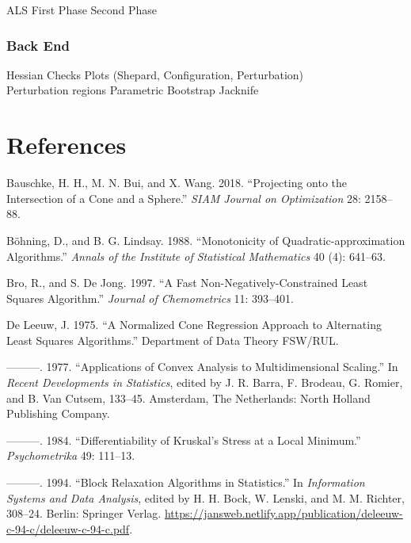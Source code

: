 \documentclass[
  12pt,
]{article}
\newlength{\cslhangindent}
\newenvironment{CSLReferences}[2] %
 {\begin{list}{}{%
  \setlength{\itemindent}{0pt}
  \setlength{\leftmargin}{0pt}
  \setlength{\parsep}{0pt}
  \ifodd #1
   \setlength{\leftmargin}{\cslhangindent}
   \setlength{\itemindent}{-1\cslhangindent}
  \fi
  \setlength{\itemsep}{#2\baselineskip}}}
 {\end{list}}
\begin{document}
ALS
First Phase
Second Phase

\subsubsection{Back End}\label{back-end}

Hessian
Checks
Plots (Shepard, Configuration, Perturbation)\\
Perturbation regions
Parametric Bootstrap
Jacknife

\section*{References}\label{references}

\label{refs}
\begin{CSLReferences}{1}{0}
Bauschke, H. H., M. N. Bui, and X. Wang. 2018. {``{Projecting onto the Intersection of a Cone and a Sphere}.''} \emph{SIAM Journal on Optimization} 28: 2158--88.

Böhning, D., and B. G. Lindsay. 1988. {``{Monotonicity of Quadratic-approximation Algorithms}.''} \emph{Annals of the Institute of Statistical Mathematics} 40 (4): 641--63.

Bro, R., and S. De Jong. 1997. {``A Fast Non-Negatively-Constrained Least Squares Algorithm.''} \emph{Journal of Chemometrics} 11: 393--401.

De Leeuw, J. 1975. {``{A Normalized Cone Regression Approach to Alternating Least Squares Algorithms}.''} Department of Data Theory FSW/RUL.

---------. 1977. {``Applications of Convex Analysis to Multidimensional Scaling.''} In \emph{Recent Developments in Statistics}, edited by J. R. Barra, F. Brodeau, G. Romier, and B. Van Cutsem, 133--45. Amsterdam, The Netherlands: North Holland Publishing Company.

---------. 1984. {``{Differentiability of Kruskal's Stress at a Local Minimum}.''} \emph{Psychometrika} 49: 111--13.

---------. 1994. {``{Block Relaxation Algorithms in Statistics}.''} In \emph{Information Systems and Data Analysis}, edited by H. H. Bock, W. Lenski, and M. M. Richter, 308--24. Berlin: Springer Verlag. \url{https://jansweb.netlify.app/publication/deleeuw-c-94-c/deleeuw-c-94-c.pdf}.


\end{CSLReferences}
\end{document}
